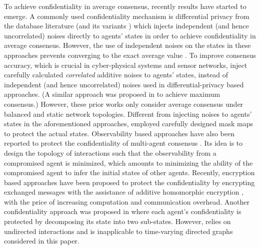\documentclass{IEEEtran}
\begin{document}
To achieve confidentiality in average consensus, recently results have started to emerge. A commonly used confidentiality mechanism is differential privacy from the database literature \cite{huang2012differentially, huang2015differentially, nozari2015differentially, nozari2017differentially, katewa2017privacy, gao2019differentially, ye2019differentially} (and its variants \cite{kefayati2007secure, wang2018privacy}) which injects independent (and hence uncorrelated) noises directly to agents' states in order to achieve confidentiality in average consensus. However, the use of independent noises on the states in these approaches prevents converging to the exact average value \cite{wang2017differential}. To improve consensus accuracy, which is crucial in cyber-physical systems and sensor networks, \cite{ he2018distributed, he2019consensus, he2018privacy, mo2017privacy, charalambous2019privacy, gupta2019statistical, pilet2019robust, manitara2013privacy} inject carefully calculated {\it correlated} additive noises to agents' states, instead of independent (and hence uncorrelated) noises used in differential-privacy based approaches. (A similar approach was proposed in \cite{duan2015privacy} to achieve maximum consensus.) However, these prior works only consider average consensus under balanced and static network topologies. Different from injecting noises to agents' states in the aforementioned approaches, \cite{altafini2019dynamical} employed carefully designed mask maps to protect the actual states. Observability based approaches have also been reported to protect the confidentiality of multi-agent consensus \cite{pequito2014design, ridgley2019simple, alaeddini2017adaptive}. Its idea is to design the topology of interactions such that the observability from a compromised agent is minimized, which amounts to minimizing the ability of the compromised agent to infer the initial states of other agents. Recently, encryption based approaches have been proposed to protect the confidentiality by encrypting exchanged messages with the assistance of additive homomorphic encryption \cite{ kishida2018encrypted, hadjicostis2020privacy, fang2018secure, ruan2019secure}, with the price of increasing computation and communication overhead. Another confidentiality approach was proposed in \cite{wang2019privacy} where each agent's confidentiality is protected by decomposing its state into two sub-states. However, \cite{wang2019privacy} relies on undirected interactions and is inapplicable to time-varying directed graphs considered in this paper.
\end{document}
